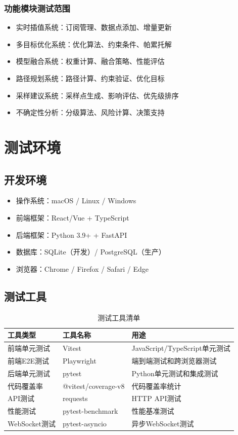 \documentclass[12pt,a4paper,openany]{report}
\begin{document}
\subsubsection{功能模块测试范围}

\begin{itemize}
    \item 实时插值系统：订阅管理、数据点添加、增量更新
    \item 多目标优化系统：优化算法、约束条件、帕累托解
    \item 模型融合系统：权重计算、融合策略、性能评估
    \item 路径规划系统：路径计算、约束验证、优化目标
    \item 采样建议系统：采样点生成、影响评估、优先级排序
    \item 不确定性分析：分级算法、风险计算、决策支持
\end{itemize}

\section{测试环境}

\subsection{开发环境}

\begin{itemize}
    \item 操作系统：macOS / Linux / Windows
    \item 前端框架：React/Vue + TypeScript
    \item 后端框架：Python 3.9+ + FastAPI
    \item 数据库：SQLite（开发）/ PostgreSQL（生产）
    \item 浏览器：Chrome / Firefox / Safari / Edge
\end{itemize}

\subsection{测试工具}

\begin{table}[h]
\centering
\caption{测试工具清单}
\begin{tabular}{|l|l|l|}
\hline
\textbf{工具类型} & \textbf{工具名称} & \textbf{用途} \\
\hline
前端单元测试 & Vitest & JavaScript/TypeScript单元测试 \\
前端E2E测试 & Playwright & 端到端测试和跨浏览器测试 \\
后端单元测试 & pytest & Python单元测试和集成测试 \\
代码覆盖率 & @vitest/coverage-v8 & 代码覆盖率统计 \\
API测试 & requests & HTTP API测试 \\
性能测试 & pytest-benchmark & 性能基准测试 \\
WebSocket测试 & pytest-asyncio & 异步WebSocket测试 \\
\hline
\end{tabular}
\end{table}
\end{document}
